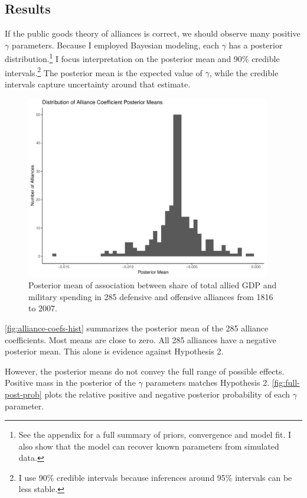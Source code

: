 \documentclass[12pt]{article}
\begin{document}
\subsection{Results} 


If the public goods theory of alliances is correct, we should observe many positive $\gamma$ parameters. 
Because I employed Bayesian modeling, each $\gamma$ has a posterior distribution.\footnote{See the appendix for a full summary of priors, convergence and model fit. I also show that the model can recover known parameters from simulated data.} 
I focus interpretation on the posterior mean and 90\% credible intervals.\footnote{I use 90\% credible intervals because inferences around 95\% intervals can be less stable.}
The posterior mean is the expected value of $\gamma$, while the credible intervals capture uncertainty around that estimate.  


\begin{figure}[htbp]
	\centering
		\includegraphics[width=0.95\textwidth]{alliance-coefs-hist.pdf}
	\caption{Posterior mean of association between share of total allied GDP and military spending in 285 defensive and offensive alliances from 1816 to 2007.}
	\label{fig:alliance-coefs-hist}
\end{figure}


\autoref{fig:alliance-coefs-hist} summarizes the posterior mean of the 285 alliance coefficients. 
Most means are close to zero. 
All 285 alliances have a negative posterior mean. 
This alone is evidence against Hypothesis 2. 


However, the posterior means do not convey the full range of possible effects. 
Positive mass in the posterior of the $\gamma$ parameters matches Hypothesis 2. 
\autoref{fig:full-post-prob} plots the relative positive and negative posterior probability of each $\gamma$ parameter. 
\end{document}
